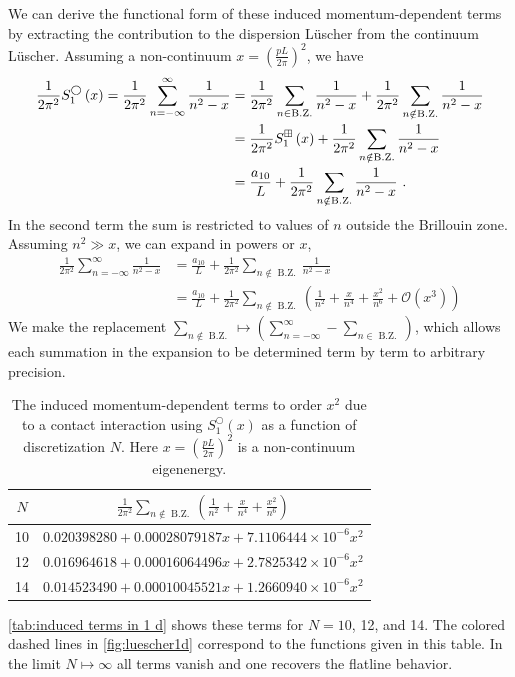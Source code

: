 We can derive the functional form of these induced momentum-dependent terms by extracting the contribution to the dispersion L\"uscher from the continuum L\"uscher.  Assuming a non-continuum $x=\left(\frac{pL}{2\pi}\right)^2$, we have
\begin{align*}
 \frac{1}{2 \pi^{2}} S^\bigcirc_{1}\left(x\right)=\frac{1}{2 \pi^{2}} \sum_{n=-\infty}^{\infty} \frac{1}{n^{2}-x} &=\frac{1}{2 \pi^{2}} \sum_{n\in \operatorname{B.Z.}} \frac{1}{n^{2}-x} +\frac{1}{2 \pi^{2}} \sum_{n\notin \operatorname{B.Z.}} \frac{1}{n^{2}-x} \\
 &= \frac{1}{2 \pi^{2}} S^{\boxplus}_{1}\left(x\right)+\frac{1}{2 \pi^{2}} \sum_{n\notin \operatorname{B.Z.}} \frac{1}{n^{2}-x}\\
&=\frac{a_{10}}{L}+\frac{1}{2 \pi^{2}} \sum_{n\notin \operatorname{B.Z.}} \frac{1}{n^{2}-x} \ .
\end{align*}
In the second term the sum is restricted to values of $n$ outside the Brillouin zone.  Assuming $n^2\gg x$, we can expand in powers or $x$,
\begin{align*}
\frac{1}{2 \pi^{2}} \sum_{n=-\infty}^{\infty} \frac{1}{n^{2}-x} &=\frac{a_{10}}{L}+\frac{1}{2 \pi^{2}} \sum_{n\notin \operatorname{B.Z.}} \frac{1}{n^{2}-x} \\
&=\frac{a_{10}}{L}+\frac{1}{2 \pi^{2}} \sum_{n\notin \operatorname{B.Z.}} \left(\frac{1}{n^2}+\frac{x}{n^4}+\frac{x^2}{n^6}+\mathcal{O}(x^3)\right)
\end{align*}
We make the replacement $\sum_{n\notin\operatorname{B.Z.}}\mapsto\left(\sum_{n=-\infty}^\infty-\sum_{n\in\operatorname{B.Z.}}\right)$, which allows each summation in the expansion to be determined term by term to arbitrary precision.  
\begin{table}
\caption{The induced momentum-dependent terms to order $x^2$ due to a contact interaction using $S^\bigcirc_1(x)$ as a function of discretization $N$.  Here $x=\left(\frac{pL}{2\pi}\right)^2$ is a non-continuum eigenenergy.  \label{tab:induced terms in 1 d}}
\begin{tabular}{c|c}
$N$ & $\frac{1}{2 \pi^{2}} \sum_{n\notin \operatorname{B.Z.}} \left(\frac{1}{n^2}+\frac{x}{n^4}+\frac{x^2}{n^6}\right)$\\
\hline
10 &$0.020398280 + 0.00028079187 x + 7.1106444\times10^{-6} x^2$\\
12 &$0.016964618 + 0.00016064496 x + 2.7825342\times10^{-6} x^2$ \\
14 &$0.014523490 + 0.00010045521 x + 1.2660940\times10^{-6} x^2$ \\
\hline
\end{tabular}
\end{table}
\autoref{tab:induced terms in 1 d} shows these terms for $N=10$, 12, and 14.  The colored dashed lines in \autoref{fig:luescher1d} correspond to the functions given in this table.  In the limit $N\mapsto\infty$ all terms vanish and one recovers the flatline behavior.  
